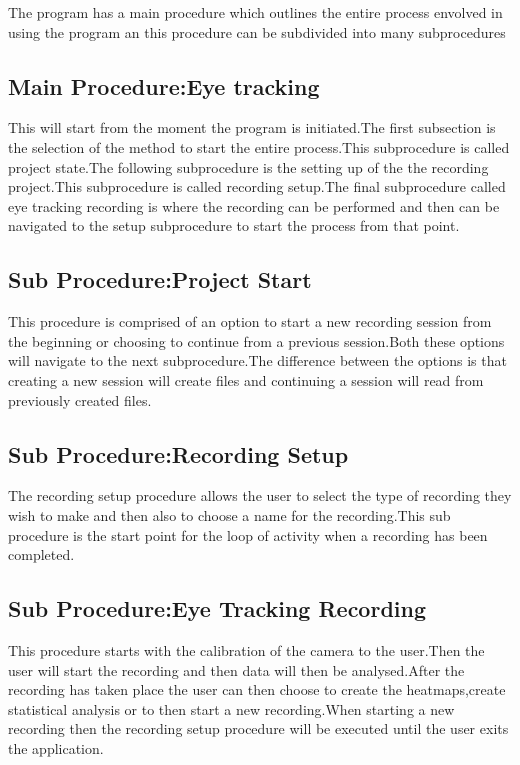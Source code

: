 The program has a main procedure which outlines the entire process envolved in using the program an this procedure can be subdivided into many subprocedures
\subsection{Main Procedure:Eye tracking}
This will start from the moment the program is initiated.The first subsection is the selection of the method to start the entire process.This subprocedure is called project state.The following subprocedure is the setting up of the the recording project.This subprocedure is called recording setup.The final subprocedure called eye tracking recording is where the recording can be performed and then can be navigated to the setup subprocedure to start the process from that point.
\subsection{Sub Procedure:Project Start}
This procedure is comprised of an option to start a new recording session from the beginning or choosing to continue from a previous session.Both these options will navigate to the next subprocedure.The difference between the options is that creating a new session will create files and continuing a session will read from previously created files. 
\subsection{Sub Procedure:Recording Setup}
The recording setup procedure allows the user to select the type of recording they wish to make and then also to choose a name for the recording.This sub procedure is the start point for the loop of activity when a recording has been completed.
\subsection{Sub Procedure:Eye Tracking Recording}
This procedure starts with the calibration of the camera to the user.Then the user will start the recording and then data will then be analysed.After the recording has taken place the user can then choose to create the heatmaps,create statistical analysis or to then start a new recording.When starting a new recording then the recording setup procedure will be executed until the user exits the application. 